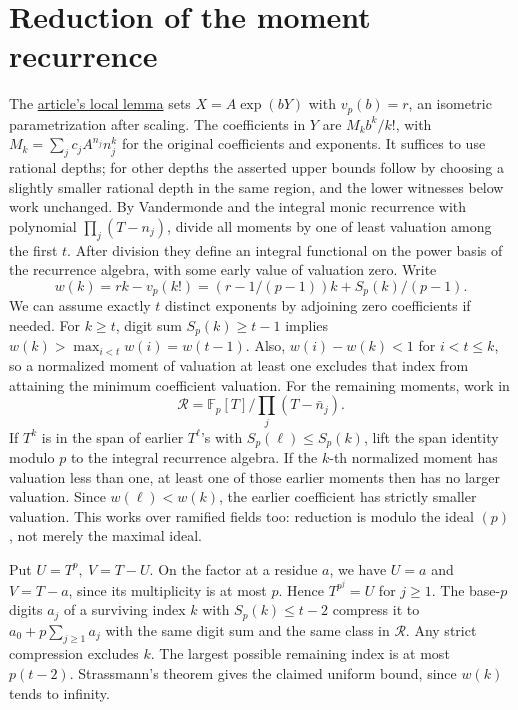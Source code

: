\documentclass[11pt]{article}
\newcommand{\F}{\mathbb F}
\begin{document}
\section{Reduction of the moment recurrence}
The \href{https://github.com/VladimirReshetnikov/ProveIt/blob/dd990b27a22290c756c1bd4adce1d971bf7e7821/Analysis/GeneralizedRiemannHypothesis/Article/sections/smd.tex#L57}{article's local lemma}
sets \(X=A\exp(bY)\) with \(v_p(b)=r\), an isometric parametrization
after scaling. The coefficients in \(Y\) are \(M_k b^k/k!\), with
\(M_k=\sum_j c_j A^{n_j}n_j^k\) for the original coefficients and exponents.
It suffices to use rational depths; for other depths the asserted
upper bounds follow by choosing a slightly smaller rational depth in
the same region, and the lower witnesses below work unchanged.
By Vandermonde and the integral monic recurrence with polynomial
\(\prod_j(T-n_j)\), divide all moments by one of least valuation among
the first \(t\). After division they define an integral functional
on the power basis of the recurrence algebra, with some early value
of valuation zero. Write
\[
 w(k)=rk-v_p(k!)=(r-1/(p-1))k+S_p(k)/(p-1).
\]
We can assume exactly \(t\) distinct exponents by adjoining zero
coefficients if needed. For \(k\ge t\), digit sum \(S_p(k)\ge t-1\)
implies \(w(k)>\max_{i<t}w(i)=w(t-1)\).
Also, \(w(i)-w(k)<1\) for \(i<t\le k\), so a normalized
moment of valuation at least one excludes that index from attaining
the minimum coefficient valuation.
\newpage
For the remaining moments, work in
\[
 \mathcal R=\F_p[T]/\prod_j(T-\bar n_j).
\]
If \(T^k\) is in the span of earlier \(T^\ell\)'s with
\(S_p(\ell)\le S_p(k)\), lift the span identity modulo \(p\) to
the integral recurrence algebra. If the \(k\)-th normalized moment
has valuation less than one, at least one of those earlier moments
then has no larger valuation. Since \(w(\ell)<w(k)\), the earlier
coefficient has strictly smaller valuation. This works over ramified
fields too: reduction is modulo the ideal \((p)\), not merely the
maximal ideal.

Put \(U=T^p,\ V=T-U\). On the factor at a residue \(a\), we have
\(U=a\) and \(V=T-a\), since its multiplicity is at most \(p\).
Hence \(T^{p^j}=U\) for \(j\ge1\).
The base-\(p\) digits \(a_j\) of a surviving index \(k\) with
\(S_p(k)\le t-2\) compress it to \(a_0+p\sum_{j\ge1}a_j\) with
the same digit sum and the same class in \(\mathcal R\). Any strict
compression excludes \(k\). The largest possible remaining index
is at most \(p(t-2)\). Strassmann's theorem gives the claimed
uniform bound, since \(w(k)\) tends to infinity.
\end{document}
